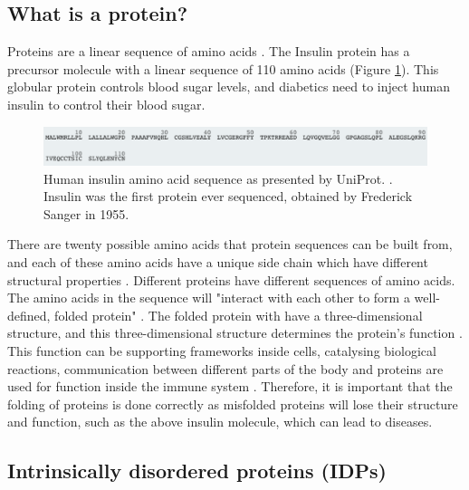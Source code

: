 \documentclass{l4proj}
\begin{document}
\subsection{What is a protein?}

Proteins are a linear sequence of amino acids \citep{Connor:10}. The Insulin protein has a precursor molecule with a linear sequence of 110 amino acids (Figure \ref{fig:sequence example}). This globular protein controls blood sugar levels, and diabetics need to inject human insulin to control their blood sugar.

\begin{figure}[!h]
    \centering
    \includegraphics[width=\linewidth]{images/bgseq.pdf}

    \caption{Human insulin amino acid sequence as presented by UniProt. \citep{uniprot:22}. Insulin was the first protein ever sequenced, obtained by Frederick Sanger in 1955.}

    \label{fig:sequence example} 
\end{figure}

There are twenty possible amino acids that protein sequences can be built from, and each of these amino acids have a unique side chain which have different structural properties \citep{aa:wiki}. Different proteins have different sequences of amino acids. The amino acids in the sequence will "interact with each other to form a well-defined, folded protein" \citep{Cheriyedath:19}. The folded protein with have a three-dimensional structure, and this three-dimensional structure determines the protein's function \citep{bbc_bitesize}. This function can be supporting frameworks inside cells, catalysing biological reactions, communication between different parts of the body and proteins are used for function inside the immune system \citep{bbc_bitesize}. Therefore, it is important that the folding of proteins is done correctly as misfolded proteins will lose their structure and function, such as the above insulin molecule, which can lead to diseases.

\subsection{Intrinsically disordered proteins (IDPs)}
\label{chap:background sec:IDPs}
\end{document}

